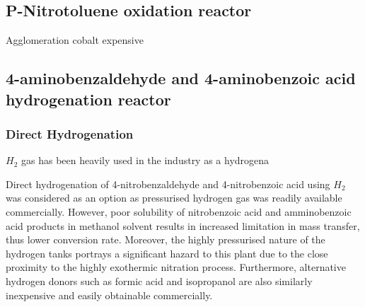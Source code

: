 \subsection{P-Nitrotoluene oxidation reactor}
Agglomeration
cobalt expensive

\subsection{4-aminobenzaldehyde and 4-aminobenzoic acid hydrogenation reactor}
\subsubsection{Direct Hydrogenation}
$H_2$ gas has been heavily used in the industry as a hydrogena

Direct hydrogenation of 4-nitrobenzaldehyde and 4-nitrobenzoic acid using $H_2$ was considered as an option as pressurised hydrogen gas was readily available commercially. However, poor solubility of nitrobenzoic acid and amminobenzoic acid products in methanol solvent results in increased limitation in mass transfer, thus lower conversion rate. Moreover, the highly pressurised nature of the hydrogen tanks portrays a significant hazard to this plant due to the close proximity to the highly exothermic nitration process. Furthermore, alternative hydrogen donors such as formic acid and isopropanol are also similarly inexpensive and easily obtainable commercially.  


